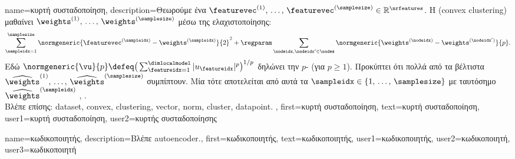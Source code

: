 {name={\foreignlanguage{greek}{κυρτή συσταδοποίηση}}, 
 	description={\foreignlanguage{greek}{Θεωρούμε ένα} 
		 $\featurevec^{(1)}, \,\ldots, \,\featurevec^{(\samplesize)} \in \mathbb{R}^{\nrfeatures}$. 
 		\foreignlanguage{greek}{Η}   (convex clustering) \foreignlanguage{greek}{μαθαίνει} 
		 $\weights^{(1)}, \,\ldots, \,\weights^{(\samplesize)}$ \foreignlanguage{greek}{μέσω της ελαχιστοποίησης}:
 		$$\sum_{\sampleidx=1}^{\samplesize} \normgeneric{\featurevec^{(\sampleidx)} - \weights^{(\sampleidx)}}{2}^2 + 
 		\regparam \sum_{\nodeidx,\nodeidx' \in \nodes} \normgeneric{\weights^{(\nodeidx)} - \weights^{(\nodeidx')}}{p}.$$ 
		\foreignlanguage{greek}{Εδώ} $\normgeneric{\vu}{p} \defeq \big( \sum_{\featureidx=1}^{\dimlocalmodel} |u_{\featureidx}|^{p} \big)^{1/p}$ 
		\foreignlanguage{greek}{δηλώνει την} $p$- (\foreignlanguage{greek}{για} $p\geq1$).  
		\foreignlanguage{greek}{Προκύπτει ότι πολλά από τα βέλτιστα}  
		$\widehat{\weights}^{(1)}, \,\ldots, \,\widehat{\weights}^{(\samplesize)}$ 
		\foreignlanguage{greek}{συμπίπτουν. Μία}  \foreignlanguage{greek}{τότε αποτελείται από αυτά τα} 
		\linebreak $\sampleidx \in \{1, \,\ldots, \,\samplesize\}$ 
		\foreignlanguage{greek}{με ταυτόσημο} $\widehat{\weights}^{(\sampleidx)}$ \cite{JMLR:v22:18-694}, \cite{Pelckmans2005}.
		\\
		\foreignlanguage{greek}{Βλέπε επίσης:} \gls{dataset}, \gls{convex}, \gls{clustering}, \gls{vector}, \gls{norm}, \gls{cluster}, \gls{datapoint}. },
 	first={\foreignlanguage{greek}{κυρτή συσταδοποίηση}},
	text={\foreignlanguage{greek}{κυρτή συσταδοποίηση}},
	user1={\foreignlanguage{greek}{κυρτή συσταδοποίηση}}, %
	user2={\foreignlanguage{greek}{κυρτής συσταδοποίησης}} %
}

{name={\foreignlanguage{greek}{κωδικοποιητής}}, 
	description={\foreignlanguage{greek}{Βλέπε} \gls{autoencoder}.}, 
 	first={\foreignlanguage{greek}{κωδικοποιητής}},
 	text={\foreignlanguage{greek}{κωδικοποιητής}}, 
	user1={\foreignlanguage{greek}{κωδικοποιητής}}, %
    	user2={\foreignlanguage{greek}{κωδικοποιητή}}, %
	user3={\foreignlanguage{greek}{κωδικοποιητή}} %
}

